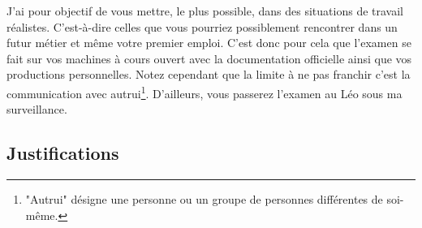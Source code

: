J'ai pour objectif de vous mettre, le plus possible, dans des situations de travail réalistes. C'est-à-dire celles que vous pourriez possiblement rencontrer dans un futur métier et même votre premier emploi. C'est donc pour cela que l'examen se fait sur vos machines à cours ouvert avec la documentation officielle ainsi que vos productions personnelles. Notez cependant que la limite à ne pas franchir c'est la communication avec autrui\footnote{"Autrui" désigne une personne ou un groupe de personnes différentes de soi-même.}. D'ailleurs, vous passerez l'examen au Léo sous ma surveillance.


\subsection{Justifications}
\label{evaluation_des_apprentissages_justifications}
